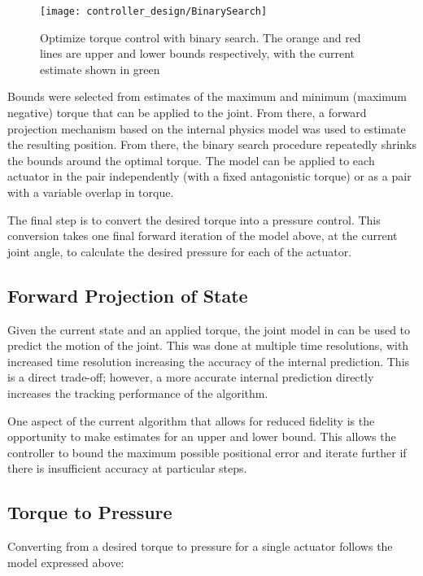 \begin{figure}
\centering
\texttt{[image: controller\_design/BinarySearch]}
\caption{Optimize torque control with binary search. The orange and red lines are upper and lower bounds respectively, with the current estimate shown in green}
\label{fig:BinarySearch}
\end{figure}

Bounds were selected from estimates
of the maximum and minimum (maximum negative) torque that can be applied to the
joint. From there, a forward projection mechanism based on the internal physics model was
used to estimate the resulting position. From there, the binary search procedure
repeatedly shrinks the bounds around the optimal torque. The model can be 
applied to each actuator in the pair independently (with a fixed antagonistic 
torque) or as a pair with a variable overlap in torque. 

The final
step is to convert the desired torque into a pressure control. This conversion takes
one final forward iteration of the model above, at the current joint angle, to 
calculate the desired pressure for each of the actuator.

\subsection{Forward Projection of State}

Given the current state and an applied torque, the joint model in 
 can be used to predict the motion of the joint.
This was done at multiple time resolutions, with increased time resolution 
increasing the accuracy of the internal prediction. This is a direct trade-off;
however, a more accurate internal prediction directly increases the tracking
performance of the algorithm.

One aspect of the current algorithm that allows for reduced fidelity is the 
opportunity to make estimates for an upper and lower bound. This allows the 
controller to bound the maximum possible positional error and iterate further
if there is insufficient accuracy at particular steps.

\subsection{Torque to Pressure}

Converting from a desired torque to pressure for a single actuator follows
the model expressed above:

